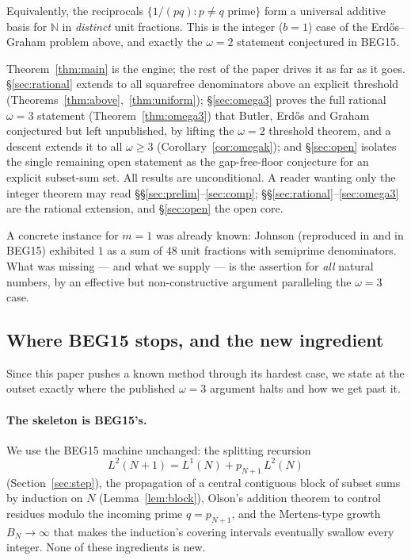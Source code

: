 \documentclass[11pt]{amsart}
\theoremstyle{plain}
\theoremstyle{definition}
\newcommand{\N}{\mathbb{N}}
\begin{document}
Equivalently, the reciprocals $\{1/(pq):p\ne q\text{ prime}\}$ form a universal
additive basis for $\N$ in \emph{distinct} unit fractions.  This is the integer
($b=1$) case of the Erd\H{o}s--Graham problem above, and exactly the $\omega=2$
statement conjectured in BEG15.

Theorem~\ref{thm:main} is the engine; the rest of the paper drives it as far as it
goes. \S\ref{sec:rational} extends to all squarefree denominators above an explicit
threshold (Theorems~\ref{thm:above},~\ref{thm:uniform}); \S\ref{sec:omega3} proves
the full rational $\omega=3$ statement (Theorem~\ref{thm:omega3}) that Butler,
Erd\H{o}s and Graham conjectured but left unpublished, by lifting the
$\omega=2$ threshold theorem, and a descent extends it to all $\omega\ge3$
(Corollary~\ref{cor:omegak}); and \S\ref{sec:open} isolates the single remaining
open statement as the gap-free-floor conjecture for an explicit subset-sum set.
All results are unconditional.  A reader wanting only the
integer theorem may read \S\S\ref{sec:prelim}--\ref{sec:comp}; \S\S\ref{sec:rational}--\ref{sec:omega3}
are the rational extension, and \S\ref{sec:open} the open core.

A concrete instance for $m=1$ was already known: Johnson \cite{Johnson1978}
(reproduced in \cite{Guy} and in BEG15) exhibited $1$ as a sum of $48$ unit
fractions with semiprime denominators.  What was missing --- and what we supply
--- is the assertion for \emph{all} natural numbers, by an effective but
non-constructive argument paralleling the $\omega=3$ case.

\subsection{Where BEG15 stops, and the new ingredient}\label{ssec:new}
Since this paper pushes a known method through its hardest case, we state at the
outset exactly where the published $\omega=3$ argument halts and how we get past
it.

\paragraph{The skeleton is BEG15's.}
We use the BEG15 machine unchanged: the splitting recursion
\[
L^2(N+1)=L^1(N)+p_{N+1}\,L^2(N)
\tag{S}
\]
(Section~\ref{sec:step}), the propagation of a central contiguous block of subset
sums by induction on $N$ (Lemma~\ref{lem:block}), Olson's addition theorem
\cite{Olson1968} to control residues modulo the incoming prime $q=p_{N+1}$, and
the Mertens-type growth $B_N\to\infty$ that makes the induction's covering
intervals eventually swallow every integer.  None of these ingredients is new.
\end{document}
